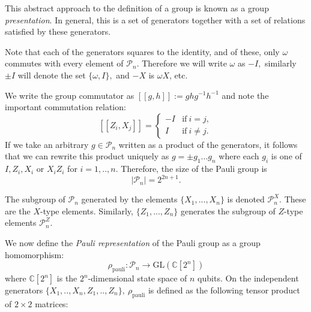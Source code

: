 \documentclass[11pt,oneside]{article}
\def\Complex{\mathbb{C}}
\def\Pauli{\mathcal{P}}
\def\GL{\mathrm{GL}}
\begin{document}
This abstract approach to the definition of a group is known as
a group \emph{presentation}. In general, this is a set of
generators together with a set of relations satisfied
by these generators.

Note that each of the generators squares to the identity,
and of these, only $\omega$ commutes with every element of $\Pauli_n.$
Therefore we will write $\omega$ as $-I,$
similarly $\pm I$ will denote the
set $\{\omega, I\},$ and $-X$ is $\omega X$, etc.

We write the group commutator as
$[[g, h]]:=ghg^{-1}h^{-1}$
and note the important commutation relation:
$$
    [[Z_i, X_j]] = 
    \left\{ \begin{array}{ll}
 -I &\mbox{if}\ i=j,\\
 I &\mbox{if}\ i\ne j.\end{array}\right.
$$
If we take an arbitrary $g\in \Pauli_n$
written as a product of the generators,
it follows that we can rewrite this
product uniquely as %
$ g = \pm g_1 ... g_n $
where each $g_i$ is one of $I, Z_i, X_i$ or $X_i Z_i$
for $i=1,..,n.$
Therefore, the size of the
Pauli group is 
$$
    |\Pauli_n| = 2^{2n+1}.
$$

The subgroup of $\Pauli_n$ generated by
the elements $\{X_1,...,X_n\}$ %
is denoted $\Pauli_n^X.$ These are the $X$-type
elements. Similarly,
 $\{Z_1,...,Z_n\}$ generates %
the subgroup of $Z$-type elements $\Pauli_n^Z$.

We now define the
{\it Pauli representation} 
of the Pauli group as a group homomorphism:
$$
    \rho_{\mathrm{pauli}} : \Pauli_n \to \GL(\Complex[2^n])
$$
where $\Complex[2^n]$ is the $2^n$-dimensional state space of $n$ qubits.
On the independent generators 
$\{X_1, .., X_n, Z_1, .., Z_n\},\ \rho_{\mathrm{pauli}}$
is defined as the following tensor product of $2\times 2$ matrices:
\end{document}
